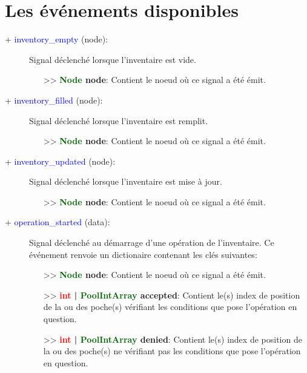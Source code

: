 \documentclass[a4paper, 11pt]{article}
\begin{document}
	\section{Les événements disponibles}
	\begin{description}
		\item [+ \textcolor{blue}{inventory\_empty} (node):] Signal déclenché lorsque l'inventaire est vide.
		\begin{itemize}
			\item [>> \textbf{\textcolor{darkgreen}{Node} node}:] Contient le noeud où ce signal a été émit.
			\\
		\end{itemize}
	\end{description}
	\begin{description}
		\item [+ \textcolor{blue}{inventory\_filled} (node):] Signal déclenché lorsque l'inventaire est 
		remplit.
		\begin{itemize}
			\item [>> \textbf{\textcolor{darkgreen}{Node} node}:] Contient le noeud où ce signal a été émit.
			\\
		\end{itemize}
	\end{description}
	\begin{description}
		\item [+ \textcolor{blue}{inventory\_updated} (node):] Signal déclenché lorsque l'inventaire est 
		mise à jour.
		\begin{itemize}
			\item [>> \textbf{\textcolor{darkgreen}{Node} node}:] Contient le noeud où ce signal a été émit.
			\\
		\end{itemize}
	\end{description}
	\begin{description}
		\item [+ \textcolor{blue}{operation\_started} (data):] Signal déclenché au démarrage d'une opération 
		de l'inventaire. Ce événement renvoie un dictionaire contenant les clés suivantes:
		\begin{itemize}
			\item [>> \textbf{\textcolor{darkgreen}{Node} node}:] Contient le noeud où ce signal a été émit.
			\item [>> \textbf{\textcolor{red}{int} | \textbf{\textcolor{darkgreen}{PoolIntArray} 
			accepted}}:] Contient le(s) index de position de la ou des poche(s) vérifiant les conditions que 
			pose l'opération en question.
			\item [>> \textbf{\textcolor{red}{int} | \textbf{\textcolor{darkgreen}{PoolIntArray} denied}}:] 
			Contient le(s) index de position de la ou des poche(s) ne vérifiant pas les conditions que pose 
			l'opération en question.\\
		\end{itemize}
	\end{description}
\end{document}
